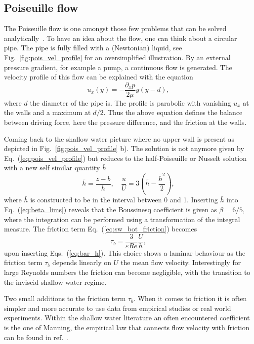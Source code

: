 \subsection{Poiseuille flow}
The Poiseuille flow is one amongst those few problems that can be solved analytically~\cite{sutera1993history}.
To have an idea about the flow, one can think about a circular pipe.
The pipe is fully filled with a (Newtonian) liquid, see Fig.~\ref{fig:pois_vel_profile} for an oversimplified illustration.
By an external pressure gradient, for example a pump, a continuous flow is generated.
The velocity profile of this flow can be explained with the equation~\cite{batchelor2000introduction, krueger2017}
\begin{equation}\label{eq:pois_vel_profile}
    u_x(y) = -\frac{\partial_x p}{2\mu}y(y-d),
\end{equation}
where $d$ the diameter of the pipe is.
The profile is parabolic with vanishing $u_x$ at the walls and a maximum at $d/2$. 
Thus the above equation defines the balance between driving force, here the pressure difference, and the friction at the walls.

Coming back to the shallow water picture where no upper wall is present as depicted in Fig.~\ref{fig:pois_vel_profile} b).
The solution is not anymore given by Eq.~(\ref{eq:pois_vel_profile}) but reduces to the half-Poiseuille or Nusselt solution with a new self similar quantity $\bar{h}$~\cite{james2019towards}
\begin{equation}\label{eq:bar_h}
    \bar{h} = \frac{z - b}{h}, \quad \frac{u}{U} = 3\left(\bar{h} - \frac{\bar{h}^2}{2}\right), 
\end{equation}
where $\bar{h}$ is constructed to be in the interval between 0 and 1.
Inserting $\bar{h}$ into Eq.~(\ref{eq:beta_lims}) reveals that the Boussinesq coefficient is given as $\beta = 6/5$, where the integration can be performed using a transformation of the integral measure.
The friction term Eq.~(\ref{eq:sw_bot_friction}) becomes 
\begin{equation}
    \tau_b = \frac{3}{\varepsilon Re}\frac{U}{h} ,
\end{equation}
upon inserting Eqs.~(\ref{eq:bar_h}).
This choice shows a laminar behaviour as the friction term $\tau_b$ depends linearly on $U$ the mean flow velocity.
Interestingly for large Reynolds numbers the friction can become negligible, with the transition to the inviscid shallow water regime.

Two small additions to the friction term $\tau_b$.
When it comes to friction it is often simpler and more accurate to use data from empirical studies or real world experiments.
Within the shallow water literature an often encountered coefficient is the one of Manning, the empirical law that connects flow velocity with friction can be found in ref.~\cite{sturm2021open}.

